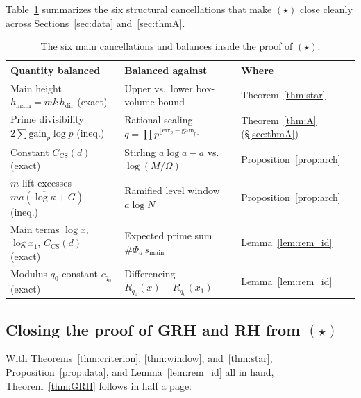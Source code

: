 \documentclass[11pt]{amsart}
\newcommand{\smain}{s_{\mathrm{main}}}
\newcommand{\hmain}{h_{\mathrm{main}}}
\newcommand{\hdir}{h_{\mathrm{dir}}}
\theoremstyle{definition}
\theoremstyle{remark}
\begin{document}
Table~\ref{tab:cancel} summarizes the six structural cancellations that make $(\star)$ close cleanly across Sections~\ref{sec:data} and~\ref{sec:thmA}.

\begin{table}[htbp]
\centering\footnotesize
\caption{The six main cancellations and balances inside the proof of $(\star)$.}\label{tab:cancel}
\begin{tabular}{@{}lll@{}}
\toprule
Quantity balanced & Balanced against & Where\\
\midrule
Main height $\hmain=mk\,\hdir$ (exact) & Upper vs.\ lower box-volume bound & Theorem~\ref{thm:star}\\
Prime divisibility $2\sum\mathrm{gain}_p\log p$ (ineq.) & Rational scaling $q=\prod p^{\lfloor\mathrm{err}_p-\mathrm{gain}_p\rfloor}$ & Theorem~\ref{thm:A} (\S\ref{sec:thmA})\\
Constant $C_{\mathrm{CS}}(d)$ (exact) & Stirling $a\log a-a$ vs.\ $\log(M/\Omega)$ & Proposition~\ref{prop:arch}\\
$m$ lift excesses $ma(\overline{\log\kappa}+G)$ (ineq.) & Ramified level window $a\log N$ & Proposition~\ref{prop:arch}\\
Main terms $\log x$, $\log x_1$, $C_{\mathrm{CS}}(d)$ (exact) & Expected prime sum $\#\Phi_a\,\smain$ & Lemma~\ref{lem:rem_id}\\
Modulus-$q_0$ constant $c_{q_0}$ (exact) & Differencing $R_{q_0}(x)-R_{q_0}(x_1)$ & Lemma~\ref{lem:rem_id}\\
\bottomrule
\end{tabular}
\end{table}

\subsection{Closing the proof of GRH and RH from \texorpdfstring{$(\star)$}{(*)}}\label{sec:close_grh}
With Theorems~\ref{thm:criterion}, \ref{thm:window}, and~\ref{thm:star}, Proposition~\ref{prop:data}, and Lemma~\ref{lem:rem_id} all in hand, Theorem~\ref{thm:GRH} follows in half a page:
\end{document}
